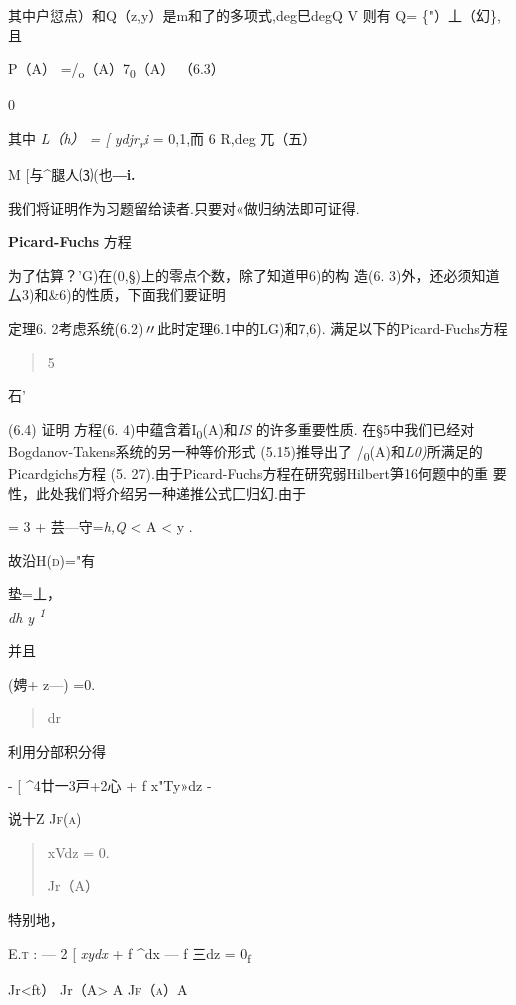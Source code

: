 \documentclass{article}
\begin{document}
其中户愆点）和Q（z,y）是m和了的多项式,deg巳degQ V 则有 Q=
\{"）丄（幻\},且

P（A） =/\textsubscript{o}（A）7\textsubscript{0}（A） （6.3）

0

其中 \emph{L（h） = {[} ydjr\textsubscript{r}i} = 0,1,而 6 R,deg
兀（五）

M {[}与\^{}腿人⑶(也―\textbf{i.}

我们将证明作为习题留给读者.只要对«做归纳法即可证得.

\textbf{Picard-Fuchs} 方程

为了估算？'G)在(0,§)上的零点个数，除了知道甲6)的构 造(6.
3)外，还必须知道厶3)和\&6)的性质，下面我们要证明

定理6. 2考虑系统(6.2)〃此时定理6.1中的LG)和7,6).
满足以下的Picard-Fuchs方程

\begin{quote}
5
\end{quote}

石'

(6.4) 证明 方程(6. 4)中蕴含着I\textsubscript{0}(A)和\emph{IS}
的许多重要性质. 在§5中我们已经对Bogdanov-Takens系统的另一种等价形式
(5.15)推导出了 /\textsubscript{0}(A)和\emph{L0)}所满足的Picardgichs方程
(5. 27).由于Picard-Fuchs方程在研究弱Hilbert笋16何题中的重
要性，此处我们将介绍另一种递推公式匚归幻.由于

= 3 + 芸---守=\emph{h,Q} \textless{} A \textless{} y .

故沿\textsc{H(d)}="有

垫=丄，\\
\emph{dh y \textsuperscript{1}}

并且

(娉+ z---) =0.

\begin{quote}
dr
\end{quote}

利用分部积分得

- {[} \^{}4廿一3戸+2心 + f x"Ty»dz -

说十Z \textsc{Jf(a)}

\begin{quote}
xVdz = 0.

Jr（A）
\end{quote}

特别地，

\textsc{E.t :} --- 2 {[} \emph{xydx} + f \^{}dx --- f 三dz =
0\textsubscript{f}

Jr\textless{}ft） Jr（A\textgreater{} A \textsc{Jf（a）A}
\end{document}
